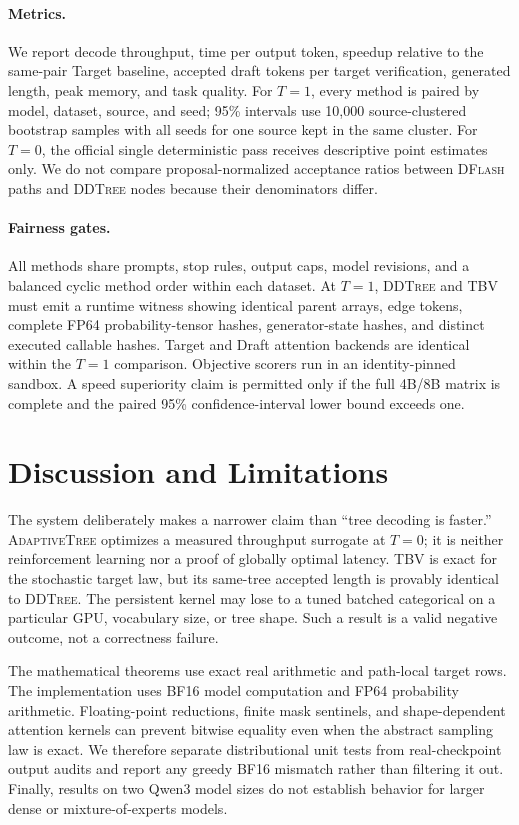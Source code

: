 \documentclass{article}
\newcommand{\TBV}{\textnormal{\textsc{TBV}}}
\newcommand{\AdaptiveTree}{\textnormal{\textsc{AdaptiveTree}}}
\newcommand{\DFlash}{\textnormal{\textsc{DFlash}}}
\newcommand{\DDTree}{\textnormal{\textsc{DDTree}}}
\begin{document}
\paragraph{Metrics.}
We report decode throughput, time per output token, speedup relative to the same-pair Target baseline, accepted draft tokens per target verification, generated length, peak memory, and task quality.  For $T=1$, every method is paired by model, dataset, source, and seed; 95\% intervals use 10,000 source-clustered bootstrap samples with all seeds for one source kept in the same cluster.  For $T=0$, the official single deterministic pass receives descriptive point estimates only.  We do not compare proposal-normalized acceptance ratios between \DFlash{} paths and \DDTree{} nodes because their denominators differ.

\paragraph{Fairness gates.}
All methods share prompts, stop rules, output caps, model revisions, and a balanced cyclic method order within each dataset.  At $T=1$, \DDTree{} and \TBV{} must emit a runtime witness showing identical parent arrays, edge tokens, complete FP64 probability-tensor hashes, generator-state hashes, and distinct executed callable hashes.  Target and Draft attention backends are identical within the $T=1$ comparison.  Objective scorers run in an identity-pinned sandbox.  A speed superiority claim is permitted only if the full 4B/8B matrix is complete and the paired 95\% confidence-interval lower bound exceeds one.



\section{Discussion and Limitations}

The system deliberately makes a narrower claim than ``tree decoding is faster.''  \AdaptiveTree{} optimizes a measured throughput surrogate at $T=0$; it is neither reinforcement learning nor a proof of globally optimal latency.  \TBV{} is exact for the stochastic target law, but its same-tree accepted length is provably identical to \DDTree.  The persistent kernel may lose to a tuned batched categorical on a particular GPU, vocabulary size, or tree shape.  Such a result is a valid negative outcome, not a correctness failure.

The mathematical theorems use exact real arithmetic and path-local target rows.  The implementation uses BF16 model computation and FP64 probability arithmetic.  Floating-point reductions, finite mask sentinels, and shape-dependent attention kernels can prevent bitwise equality even when the abstract sampling law is exact.  We therefore separate distributional unit tests from real-checkpoint output audits and report any greedy BF16 mismatch rather than filtering it out.  Finally, results on two Qwen3 model sizes do not establish behavior for larger dense or mixture-of-experts models.
\end{document}
